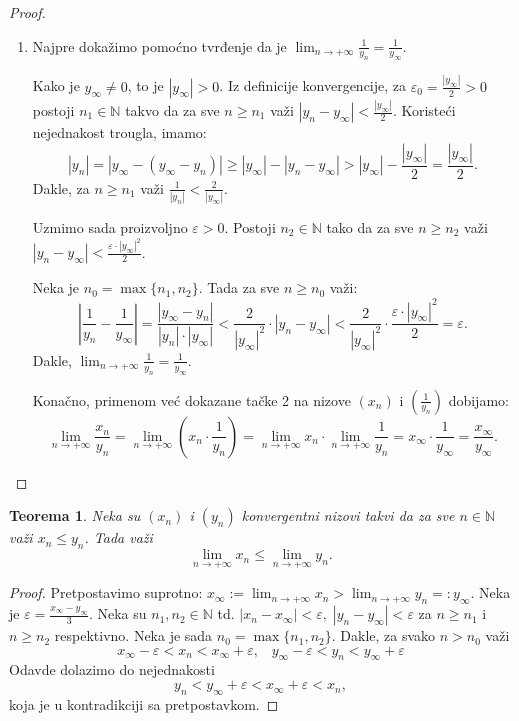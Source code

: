 \documentclass[a4paper,12pt]{article}
\theoremstyle{plain}
\newtheorem{theorem}{Teorema}[section]
\theoremstyle{definition}
\theoremstyle{remark}
\begin{document}
\begin{proof}
\begin{enumerate}
        \item Najpre dokažimo pomoćno tvrđenje da je $\lim_{n \to +\infty} \frac{1}{y_n} = \frac{1}{y_\infty}$. 
        
        Kako je $y_ \infty \neq 0$, to je $|y_\infty| > 0$. Iz definicije konvergencije, za $\varepsilon_0 = \frac{|y_\infty|}{2} > 0$ postoji $n_1 \in \mathbb{N}$ takvo da za sve $n \geq n_1$ važi $|y_n - y_\infty| < \frac{|y_\infty|}{2}$. Koristeći nejednakost trougla, imamo:
        \[
            |y_n| = |y_\infty - (y_\infty - y_n)| \geq |y_\infty| - |y_n - y_\infty| > |y_\infty| - \frac{|y_\infty|}{2} = \frac{|y_\infty|}{2}.
        \]
        Dakle, za $n \geq n_1$ važi $\frac{1}{|y_n|} < \frac{2}{|y_\infty|}$.
        
        Uzmimo sada proizvoljno $\varepsilon > 0$. Postoji $n_2 \in \mathbb{N}$ tako da za sve $n \geq n_2$ važi $|y_n - y_\infty| < \frac{\varepsilon \cdot |y_\infty|^2}{2}$.
        
        Neka je $n_0 = \max\{n_1, n_2\}$. Tada za sve $n \geq n_0$ važi:
        \[
            \left| \frac{1}{y_n} - \frac{1}{y_\infty} \right| = \frac{|y_\infty - y_n|}{|y_n| \cdot |y_\infty|} < \frac{2}{|y_\infty|^2} \cdot |y_n - y_\infty| < \frac{2}{|y_\infty|^2} \cdot \frac{\varepsilon \cdot |y_\infty|^2}{2} = \varepsilon.
        \]
        Dakle, $\lim_{n \to +\infty} \frac{1}{y_n} = \frac{1}{y_\infty}$.
        
        Konačno, primenom već dokazane tačke 2 na nizove $(x_n)$ i $(\frac{1}{y_n})$ dobijamo:
        \[
            \lim_{n \to +\infty} \frac{x_n}{y_n} = \lim_{n \to +\infty} \left( x_n \cdot \frac{1}{y_n} \right) = \lim_{n \to +\infty} x_n \cdot \lim_{n \to +\infty} \frac{1}{y_n} = x_\infty \cdot \frac{1}{y_\infty} = \frac{x_\infty}{y_\infty}.
        \]
    \end{enumerate}
\end{proof}

\begin{theorem}
    Neka su $(x_n)$ i $(y_n)$ konvergentni nizovi takvi da za sve $n \in \mathbb{N}$ važi $\displaystyle x_n \leq y_n$. Tada važi
    \[ \lim_{n \to +\infty} x_n \leq \lim_{n \to +\infty} y_n. \]
\end{theorem}
\begin{proof}
Pretpostavimo suprotno: $\displaystyle x_\infty := \lim_{n \to +\infty} x_n > \lim_{n \to +\infty} y _n =: y_\infty$. Neka je $\varepsilon = \frac{x_\infty - y_\infty}{3}$.
Neka su $n_1, n_2 \in \mathbb{N}$ td. $|x_n - x_\infty| < \varepsilon, \; |y_n - y_\infty| < \varepsilon$ za $n \geq n_1$ i $n \geq n_2$ respektivno. Neka je sada $n_0 = \max\{n_1, n_2\}$.
Dakle, za svako $n > n_0$ važi
\[ x_\infty - \varepsilon < x_n < x_\infty + \varepsilon, \; \;\;y_\infty - \varepsilon < y_n < y_\infty + \varepsilon \]
Odavde dolazimo do nejednakosti
\[ y_n < y_\infty + \varepsilon < x_\infty + \varepsilon < x_n, \]
koja je u kontradikciji sa pretpostavkom.
\end{proof}
\end{document}
